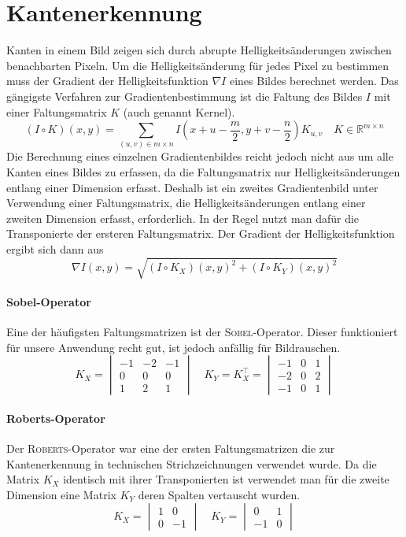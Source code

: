 \section*{Kantenerkennung}
\writtenby{\dcauthornameewie}%
Kanten in einem Bild zeigen sich durch abrupte Helligkeitsänderungen zwischen benachbarten Pixeln.
Um die Helligkeitsänderung für jedes Pixel zu bestimmen muss der Gradient der Helligkeitsfunktion $\nabla I$ eines Bildes berechnet werden.
Das gängigste Verfahren zur Gradientenbestimmung ist die Faltung des Bildes $I$ mit einer Faltungsmatrix $K$ (auch genannt Kernel).
  \[ (I\circ K)(x,y) =
       \sum_{(u,v)\in m\times n}
       I\left(x+u-\frac{m}{2},y+v-\frac{n}{2}\right)K_{u,v}
       \quad K\in\mathbb{R}^{m\times n} \]
Die Berechnung eines einzelnen Gradientenbildes reicht jedoch nicht aus um alle Kanten eines Bildes zu erfassen, da die Faltungsmatrix nur Helligkeitsänderungen entlang einer Dimension erfasst.
Deshalb ist ein zweites Gradientenbild unter Verwendung einer Faltungsmatrix, die Helligkeitsänderungen entlang einer zweiten Dimension erfasst, erforderlich.
In der Regel nutzt man dafür die Transponierte der ersteren Faltungsmatrix.
Der Gradient der Helligkeitsfunktion ergibt sich dann aus
  \[ \nabla I(x,y) = \sqrt{(I \circ K_X)(x,y)^2 + (I \circ K_Y)(x,y)^2} \]

\paragraph{Sobel-Operator}
Eine der häufigsten Faltungsmatrizen ist der \textsc{Sobel}-Operator.
Dieser funktioniert für unsere Anwendung recht gut, ist jedoch anfällig für Bildrauschen.
  \[ K_X = \begin{vmatrix}
       -1 & -2 & -1 \\
        0 &  0 &  0 \\
        1 &  2 &  1
     \end{vmatrix}
     \quad
     K_Y = K_X^\top = \begin{vmatrix}
       -1 & 0 & 1 \\
       -2 & 0 & 2 \\
       -1 & 0 & 1
     \end{vmatrix} \]

\paragraph{Roberts-Operator}
Der \textsc{Roberts}-Operator \cite{DBLP:books/garland/Roberts63} war eine der ersten Faltungsmatrizen die zur Kantenerkennung in technischen Strichzeichnungen verwendet wurde.
Da die Matrix $K_X$ identisch mit ihrer Transponierten ist verwendet man für die zweite Dimension eine Matrix $K_Y$ deren Spalten vertauscht wurden.
  \[ K_X = \begin{vmatrix}
       1 &  0 \\
       0 & -1
     \end{vmatrix}
     \quad
     K_Y = \begin{vmatrix}
        0 & 1 \\
       -1 & 0
     \end{vmatrix} \]
